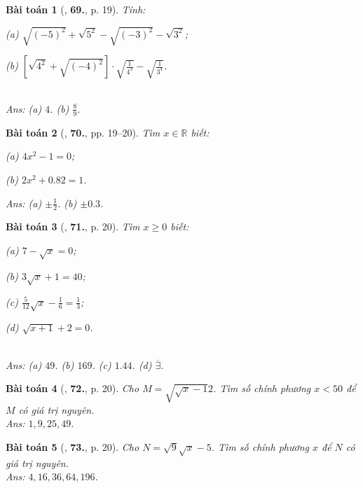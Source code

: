 \documentclass{article}
\numberwithin{equation}{section}
\newtheorem{baitoan}{Bài toán}
\begin{document}
\begin{baitoan}[\cite{Tuyen_Toan_7}, \textbf{69.}, p. 19]
	Tính:
	\begin{enumerate*}
		\item[(a)] $\sqrt{(-5)^2} + \sqrt{5^2} - \sqrt{(-3)^2} - \sqrt{3^2}$;
		\item[(b)] $\left[\sqrt{4^2} + \sqrt{(-4)^2}\right]\cdot\sqrt{\frac{1}{4^3}} - \sqrt{\frac{1}{3^4}}$.
	\end{enumerate*}\\\mbox{}\hfill\textsf{Ans:} (a) $4$. (b) $\frac{8}{9}$.
\end{baitoan}

\begin{baitoan}[\cite{Tuyen_Toan_7}, \textbf{70.}, pp. 19--20]
	Tìm $x\in\mathbb{R}$ biết:
	\begin{enumerate*}
		\item[(a)] $4x^2 - 1 = 0$;
		\item[(b)] $2x^2 + 0.82 = 1$.
	\end{enumerate*}\hfill\textsf{Ans:} (a) $\pm\frac{1}{2}$. (b) $\pm0.3$.
\end{baitoan}

\begin{baitoan}[\cite{Tuyen_Toan_7}, \textbf{71.}, p. 20]
	Tìm $x\ge 0$ biết:
	\begin{enumerate*}
		\item[(a)] $7 - \sqrt{x} = 0$;
		\item[(b)] $3\sqrt{x} + 1 = 40$;
		\item[(c)] $\frac{5}{12}\sqrt{x} - \frac{1}{6} = \frac{1}{3}$;
		\item[(d)] $\sqrt{x + 1} + 2 = 0$.
	\end{enumerate*}\\\mbox{}\hfill\textsf{Ans:} (a) $49$. (b) $169$. (c) $1.44$. (d) $\overline{\exists}$.
\end{baitoan}

\begin{baitoan}[\cite{Tuyen_Toan_7}, \textbf{72.}, p. 20]
	Cho $M = \sqrt{\sqrt{x} - 1}{2}$. Tìm số chính phương $x < 50$ để $M$ có giá trị nguyên.\\\mbox{}\hfill\textsf{Ans:} $1,9,25,49$.
\end{baitoan}

\begin{baitoan}[\cite{Tuyen_Toan_7}, \textbf{73.}, p. 20]
	Cho $N = \sqrt{9}{\sqrt{x} - 5}$. Tìm số chính phương $x$ để $N$ có giá trị nguyên.\\\mbox{}\hfill\textsf{Ans:} $4,16,36,64,196$.
\end{baitoan}
\end{document}
